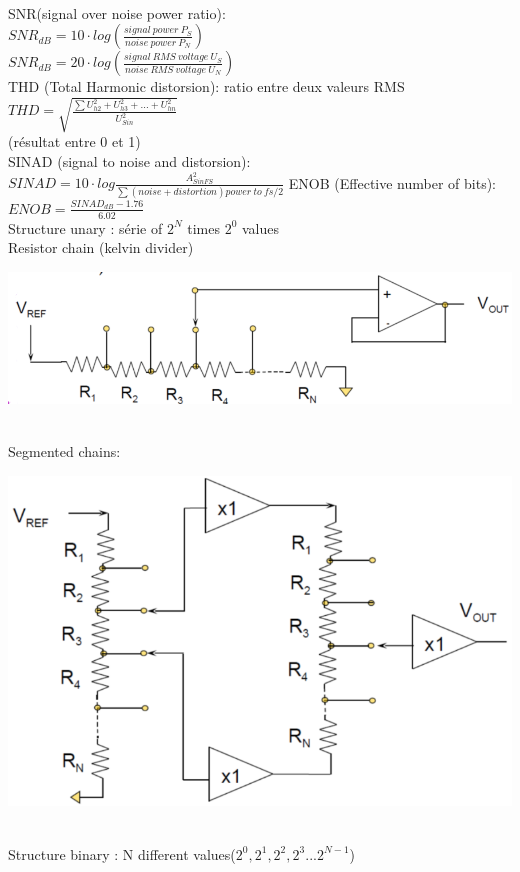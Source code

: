\documentclass[resume]{subfiles}
\begin{document}
\begin{multicols}{3}
\begin{minipage}{\linewidth}
\end{minipage}\\
SNR(signal over noise power ratio):\\
$SNR_{dB}=10\cdot log(\frac{signal\ power\ P_S}{noise\ power\ P_N})$\\
$SNR_{dB}=20\cdot log(\frac{signal\ RMS\ voltage\ U_S}{noise\ RMS\ voltage\ U_N})$\\
THD (Total Harmonic distorsion): ratio entre deux valeurs RMS\\
$THD=\sqrt{\frac{\sum U_{h2}^2+U_{h3}^2+...+U_{hn}^2}{U_{Sin}^2}}$\\
(résultat entre 0 et 1)\\
SINAD (signal to noise and distorsion):\\
$SINAD=10\cdot log\frac{A_{SinFS}^2}{\sum (noise+distortion)power\ to\ fs/2}$
ENOB (Effective number of bits):\\
$ENOB=\frac{SINAD_{dB}-1.76}{6.02}$\\
Structure unary : série of $2^N$ times $2^0$ values\\
Resistor chain (kelvin divider)\\
\begin{minipage}{\linewidth}
	\centering
    \includegraphics[width =0.7\columnwidth]{an4.png}
\end{minipage}\\
Segmented chains:\\
\begin{minipage}{\linewidth}
	\centering
    \includegraphics[width =0.7\columnwidth]{an5.png}
\end{minipage}\\
Structure binary : N different values($2^0,2^1,2^2,2^3...2^{N-1}$)\\

\end{multicols}
\end{document}

